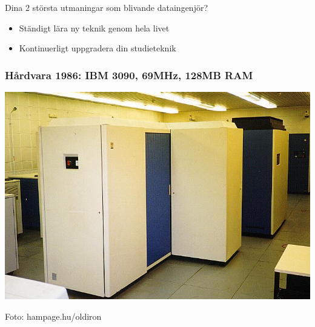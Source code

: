\documentclass{lecturesimple}
\begin{document}
\begin{Slide}{Dina 2 största utmaningar som blivande dataingenjör?}
  \begin{itemize}
    \item Ständigt lära ny teknik genom hela livet 
    \item Kontinuerligt uppgradera din studieteknik
  \end{itemize}  
\end{Slide}


{
}

\begin{frame}\frametitle{Hårdvara 1986: IBM 3090, 69MHz, 128MB RAM}
\begin{center}
     \includegraphics[width=1.0\textwidth]{../img/ibm3090.jpg}
  
    {\fontsize{5}{5}\selectfont\color{gray}
    Foto: hampage.hu/oldiron
  }
\end{center}
\end{frame}
  
\end{document}
